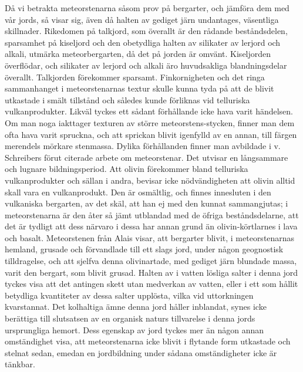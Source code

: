\documentclass[a4paper, 12pt, oneside, swedish]{article}
\begin{document}
Då vi betrakta meteorstenarna såsom prov på bergarter, och jämföra dem med vår jords, så visar sig, även då halten av gediget järn undantages, väsentliga skillnader. Rikedomen på talkjord, som överallt är den rådande beståndsdelen, sparsamhet på kiseljord och den obetydliga halten av silikater av lerjord och alkali, utmärka meteorbergarten, då det på jorden är omvänt. Kiseljorden överflödar, och silikater av lerjord och alkali äro huvudsakliga blandningsdelar överallt. Talkjorden förekommer sparsamt. Finkornigheten och det ringa sammanhanget i meteorstenarnas textur skulle kunna tyda på att de blivit utkastade i smält tillstånd och således kunde förliknas vid telluriska vulkanprodukter. Likväl tyckes ett sådant förhållande icke hava varit händelsen. Om man noga iakttager texturen av större meteorstens-stycken, finner man dem ofta hava varit spruckna, och att sprickan blivit igenfylld av en annan, till färgen merendels mörkare stenmassa. Dylika förhållanden finner man avbildade i v. Schreibers förut citerade arbete om meteorstenar. Det utvisar en långsammare och lugnare bildningsperiod. Att olivin förekommer bland telluriska vulkanprodukter och sällan i andra, bevisar icke nödvändigheten att olivin alltid skall vara en vulkanprodukt. Den är osmältlig, och finnes innesluten i den vulkaniska bergarten, av det skäl, att han ej med den kunnat sammangjutas; i meteorstenarna är den åter så jämt utblandad med de öfriga beståndsdelarne, att det är tydligt att dess närvaro i dessa har annan grund än olivin-körtlarnes i lava och basalt. Meteorstenen från Alais visar, att bergarter blivit, i meteorstenarnas hemland, grusade och förvandlade till ett slags jord, under någon geognostisk tilldragelse, och att sjelfva denna olivinartade, med gediget järn blundade massa, varit den bergart, som blivit grusad. Halten av i vatten lösliga salter i denna jord tyckes visa att det antingen skett utan medverkan av vatten, eller i ett som hållit betydliga kvantiteter av dessa salter upplösta, vilka vid uttorkningen kvarstannat. Det kolhaltiga ämne denna jord håller inblandat, synes icke berättiga till slutsatsen av en organisk naturs tillvarelse i denna jords ursprungliga hemort. Dess egenskap av jord tyckes mer än någon annan omständighet visa, att meteorstenarna icke blivit i flytande form utkastade och stelnat sedan, emedan en jordbildning under sådana omständigheter icke är tänkbar.
\end{document}
